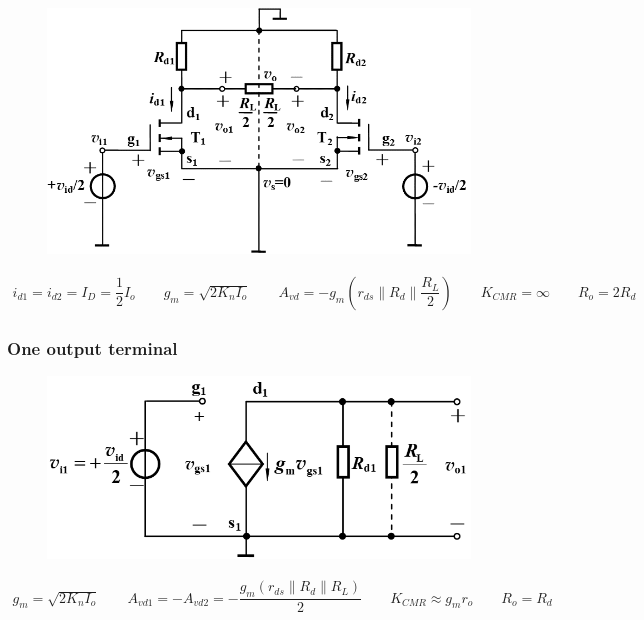 \begin{figure}[H]
  \centering
    \includegraphics[width=0.7\linewidth]{figures/Differential-Amplifier-MOS-1}
\end{figure}

\begin{equation*}
  \begin{aligned}
    i_{d1} = i_{d2} = I_D = \dfrac{1}{2} I_o \quad\quad g_m = \sqrt{2 K_n I_o} \quad\quad A_{vd} = - g_m \left( r_{ds} \parallel R_d \parallel \dfrac{R_L}{2}  \right) \quad\quad K_{CMR} = \infty \quad\quad R_o = 2 R_d
  \end{aligned}
\end{equation*}

\subsubsection{One output terminal}

\begin{figure}[H]
  \centering
    \includegraphics[width=0.7\linewidth]{figures/Differential-Amplifier-MOS-2}
\end{figure}

\begin{equation*}
  \begin{aligned}
    g_m = \sqrt{2 K_n I_o} \quad\quad A_{vd1} = - A_{vd2} = - \dfrac{g_m \left( r_{ds} \parallel R_d \parallel R_L \right) }{2} \quad\quad K_{CMR} \approx g_m r_o \quad\quad R_o = R_d
  \end{aligned}
\end{equation*}

